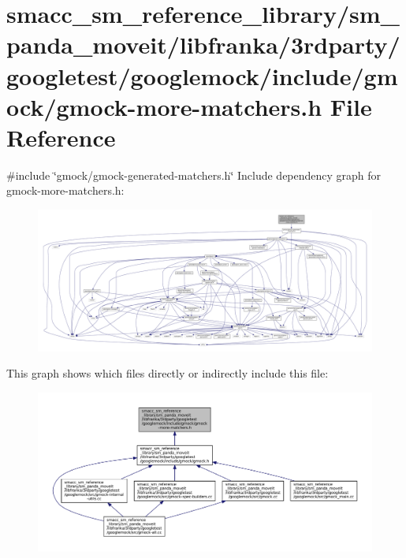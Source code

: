 \hypertarget{gmock-more-matchers_8h}{}\section{smacc\+\_\+sm\+\_\+reference\+\_\+library/sm\+\_\+panda\+\_\+moveit/libfranka/3rdparty/googletest/googlemock/include/gmock/gmock-\/more-\/matchers.h File Reference}
\label{gmock-more-matchers_8h}
{\ttfamily \#include \char`\"{}gmock/gmock-\/generated-\/matchers.\+h\char`\"{}}\newline
Include dependency graph for gmock-\/more-\/matchers.h\+:
\nopagebreak
\begin{figure}[H]
\begin{center}
\leavevmode
\includegraphics[width=350pt]{gmock-more-matchers_8h__incl}
\end{center}
\end{figure}
This graph shows which files directly or indirectly include this file\+:
\nopagebreak
\begin{figure}[H]
\begin{center}
\leavevmode
\includegraphics[width=350pt]{gmock-more-matchers_8h__dep__incl}
\end{center}
\end{figure}
